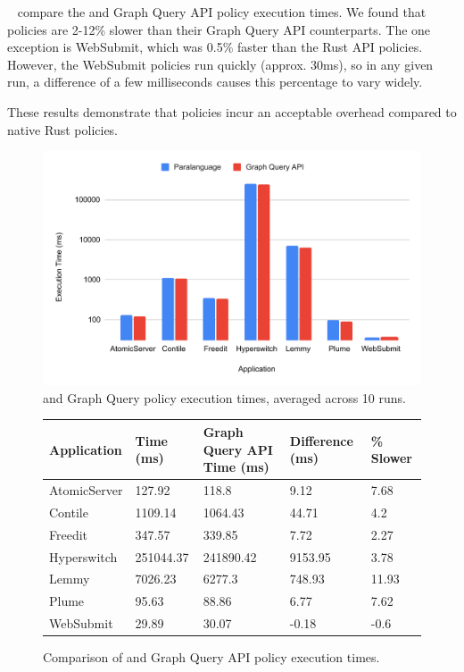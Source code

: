 ~ compare the \syslang{} and Graph Query API policy execution times.
%
We found that \syslang{} policies are 2-12\% slower than their Graph Query API counterparts.
%
The one exception is WebSubmit, which was 0.5\% faster than the Rust API policies.
%
However, the WebSubmit policies run quickly (approx. 30ms),
so in any given run, a difference of a few milliseconds causes this percentage to vary widely.

These results demonstrate that \syslang{} policies incur an acceptable overhead compared to native Rust policies.

\begin{figure}
    \begin{centering}
        \includegraphics[scale=0.6]{graphics/times.pdf}
        \caption{\syslang{} and Graph Query policy execution times, averaged across 10 runs.}
        \label{f:times}
    \end{centering}
\end{figure}
%
\begin{figure}
    \begin{tabular}{|l|p{3cm}|p{3.5cm}|p{2cm}|p{3cm}|}
        \hline
        \textbf{Application} & \textbf{\syslang{} Time (ms)} & \textbf{Graph Query API Time (ms)} & \textbf{Difference (ms)} & \textbf{\syslang{} \% Slower} \\ \hline
        AtomicServer & 127.92    & 118.8     & 9.12    & 7.68  \\ \hline
        Contile      & 1109.14   & 1064.43   & 44.71   & 4.2   \\ \hline
        Freedit      & 347.57    & 339.85    & 7.72    & 2.27  \\ \hline
        Hyperswitch  & 251044.37 & 241890.42 & 9153.95 & 3.78  \\ \hline
        Lemmy        & 7026.23   & 6277.3    & 748.93  & 11.93 \\ \hline
        Plume        & 95.63     & 88.86     & 6.77    & 7.62  \\ \hline
        WebSubmit    & 29.89     & 30.07     & -0.18   & -0.6  \\ \hline               
        \end{tabular}
        \caption{Comparison of \syslang{} and Graph Query API policy execution times.}
        \label{f:percentages}
\end{figure}

